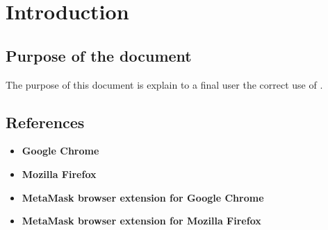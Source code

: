 \documentclass[ManualeUtente.tex]{subfiles}
\begin{document}
\chapter{Introduction}

	\section{Purpose of the document}
	The purpose of this document is explain to a final user the correct use of \progetto.
	
	\scopoProdottoEN
	
	\section{References}
		\begin{itemize}
			\item \textbf{Google Chrome}\\
			\item \textbf{Mozilla Firefox}\\
			\item \textbf{MetaMask browser extension for Google Chrome}\\
			\item \textbf{MetaMask browser extension for Mozilla Firefox}\\
		\end{itemize}
\end{document}
